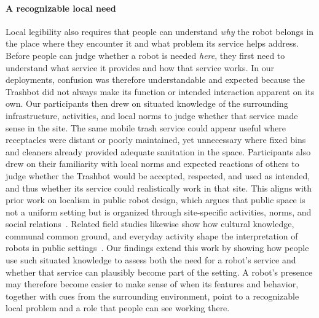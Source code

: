 \paragraph{A recognizable local need} 
Local legibility also requires that people can understand \textit{why} the robot belongs in the place where they encounter it and what problem its service helps address. Before people can judge whether a robot is needed \emph{here}, they first need to understand what service it provides and how that service works. In our deployments, confusion was therefore understandable and expected because the Trashbot did not always make its function or intended interaction apparent on its own. Our participants then drew on situated knowledge of the surrounding infrastructure, activities, and local norms to judge whether that service made sense in the site. The same mobile trash service could appear useful where receptacles were distant or poorly maintained, yet unnecessary where fixed bins and cleaners already provided adequate sanitation in the space. Participants also drew on their familiarity with local norms and expected reactions of others to judge whether the Trashbot would be accepted, respected, and used as intended, and thus whether its service could realistically work in that site. This aligns with prior work on localism in public robot design, which argues that public space is not a uniform setting but is organized through site-specific activities, norms, and social relations~\cite{pelikan2025localism}. Related field studies likewise show how cultural knowledge, communal common ground, and everyday activity shape the interpretation of robots in public settings~\cite{bu2025making}. Our findings extend this work by showing how people use such situated knowledge to assess both the need for a robot's service and whether that service can plausibly become part of the setting. A robot's presence may therefore become easier to make sense of when its features and behavior, together with cues from the surrounding environment, point to a recognizable local problem and a role that people can see working there.

